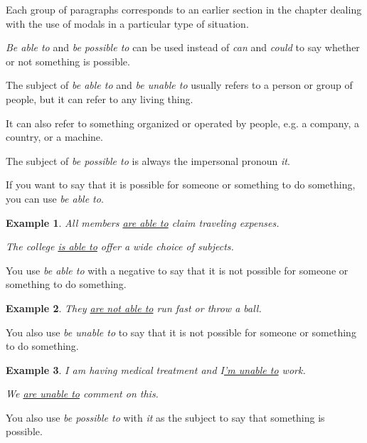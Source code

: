 \documentclass[oneside]{book}
\numberwithin{equation}{section}
\newtheorem{example}{Example}[section]
\begin{document}
Each group of paragraphs corresponds to an earlier section in the chapter dealing with the use of modals in a particular type of situation.

%
\noindent{} \textit{Be able to} and \textit{be possible to} can be used instead of \textit{can} and \textit{could} to say whether or not something is possible.

%
The subject of \textit{be able to} and \textit{be unable to} usually refers to a person or group of people, but it can refer to any living thing.

It can also refer to something organized or operated by people, e.g. a company, a country, or a machine.

%
The subject of \textit{be possible to} is always the impersonal pronoun \textit{it}.

%
\noindent{} If you want to say that it is possible for someone or something to do something, you can use \textit{be able to}.
\begin{example}
    All members \underline{are able to} claim traveling expenses.
    
    The college \underline{is able to} offer a wide choice of subjects.
\end{example}
You use \textit{be able to} with a negative to say that it is not possible for someone or something to do something.
\begin{example}
    They \underline{are not able to} run fast or throw a ball.
\end{example}
%
\noindent{} You also use \textit{be unable to} to say that it is not possible for someone or something to do something.
\begin{example}
    I am having medical treatment and I\underline{'m unable to} work.
    
    We \underline{are unable to} comment on this.
\end{example}
%
\noindent{} You also use \textit{be possible to} with \textit{it} as the subject to say that something is possible.
\end{document}
